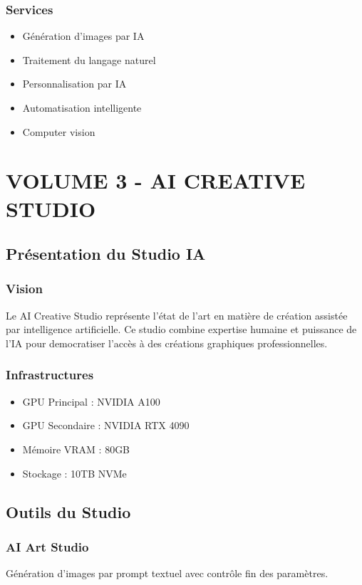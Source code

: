 \documentclass[12pt,a4paper,oneside]{book}
\begin{document}
\section{Services}
\begin{itemize}
\item Génération d'images par IA
\item Traitement du langage naturel
\item Personnalisation par IA
\item Automatisation intelligente
\item Computer vision
\end{itemize}

\part{VOLUME 3 - AI CREATIVE STUDIO}

\chapter{Présentation du Studio IA}

\section{Vision}
Le AI Creative Studio représente l'état de l'art en matière de création assistée par intelligence artificielle. Ce studio combine expertise humaine et puissance de l'IA pour democratiser l'accès à des créations graphiques professionnelles.

\section{Infrastructures}
\begin{itemize}
\item GPU Principal : NVIDIA A100
\item GPU Secondaire : NVIDIA RTX 4090
\item Mémoire VRAM : 80GB
\item Stockage : 10TB NVMe
\end{itemize}

\chapter{Outils du Studio}

\section{AI Art Studio}
Génération d'images par prompt textuel avec contrôle fin des paramètres.
\end{document}
